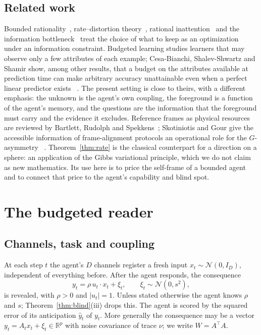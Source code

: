 \documentclass[12pt]{article}
\theoremstyle{definition}
\newcommand{\R}{\mathbb R}
\begin{document}
\subsection{Related work}

Bounded rationality~\cite{Simon1955}, rate--distortion theory~\cite{Shannon1959,CoverThomas2006}, rational inattention~\cite{Sims2003} and the information bottleneck~\cite{Tishby2000} treat the choice of what to keep as an optimization under an information constraint. Budgeted learning studies learners that may observe only a few attributes of each example; Cesa-Bianchi, Shalev-Shwartz and Shamir show, among other results, that a budget on the attributes available at prediction time can make arbitrary accuracy unattainable even when a perfect linear predictor exists~\cite{CesaBianchi2011} . The present setting is close to theirs, with a different emphasis: the unknown is the agent's own coupling, the foreground is a function of the agent's memory, and the questions are the information that the foreground must carry and the evidence it excludes. Reference frames as physical resources are reviewed by Bartlett, Rudolph and Spekkens~\cite{BRS2007}; Skotiniotis and Gour give the accessible information of frame-alignment protocols an operational role for the $G$-asymmetry~\cite{SkotiniotisGour2012} . Theorem~\ref{thm:rate} is the classical counterpart for a direction on a sphere: an application of the Gibbs variational principle, which we do not claim as new mathematics. Its use here is to price the self-frame of a bounded agent and to connect that price to the agent's capability and blind spot.

\section{The budgeted reader}
\label{sec:model}

\subsection{Channels, task and coupling}

At each step $t$ the agent's $D$ channels register a fresh input $x_t\sim\mathcal N(0,I_D)$, independent of everything before. After the agent responds, the consequence
\begin{equation}
\label{eq:task}
y_t=\rho\,u_t\cdot x_t+\xi_t,\qquad \xi_t\sim\mathcal N(0,s^2),
\end{equation}
is revealed, with $\rho>0$ and $|u_t|=1$. Unless stated otherwise the agent knows $\rho$ and $s$; Theorem~\ref{thm:blind}(iii) drops this. The agent is scored by the squared error of its anticipation $\hat y_t$ of $y_t$. More generally the consequence may be a vector $y_t=A_tx_t+\xi_t\in\R^p$ with noise covariance of trace $\nu$; we write $W=A^{\top}A$.
\end{document}
